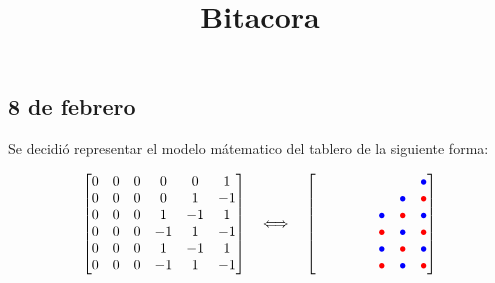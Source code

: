 \documentclass[12pt,a4paper]{article}
\title{Bitacora}
\date{}
\begin{document}
 
\maketitle


\subsection{8 de febrero}

Se decidió representar el modelo mátematico del tablero de la siguiente forma:



\[
\begin{bmatrix}
0 & 0 & 0 & 0 &  0 &  1 \\
0 & 0 & 0 & 0 &  1 & -1 \\
0 & 0 & 0 &  1 & -1 &  1 \\
0 & 0 & 0 & -1 &  1 & -1 \\
0 & 0 & 0 &  1 & -1 &  1 \\
0 & 0 & 0 & -1 &  1 & -1
\end{bmatrix}
\quad \Longleftrightarrow \quad
\begin{bmatrix}
\phantom{\bullet} & \phantom{\bullet} & \phantom{\bullet} & \phantom{\bullet} & \phantom{\bullet} & \textcolor{blue}{\bullet} \\
\phantom{\bullet} & \phantom{\bullet} & \phantom{\bullet} & \phantom{\bullet} & \textcolor{blue}{\bullet} & \textcolor{red}{\bullet} \\
\phantom{\bullet} & \phantom{\bullet} & \phantom{\bullet} & \textcolor{blue}{\bullet} & \textcolor{red}{\bullet} & \textcolor{blue}{\bullet} \\
\phantom{\bullet} & \phantom{\bullet} & \phantom{\bullet} & \textcolor{red}{\bullet} & \textcolor{blue}{\bullet} & \textcolor{red}{\bullet} \\
\phantom{\bullet} & \phantom{\bullet} & \phantom{\bullet} & \textcolor{blue}{\bullet} & \textcolor{red}{\bullet} & \textcolor{blue}{\bullet} \\
\phantom{\bullet} & \phantom{\bullet} & \phantom{\bullet} & \textcolor{red}{\bullet} & \textcolor{blue}{\bullet} & \textcolor{red}{\bullet}
\end{bmatrix}
\]
\end{document}
